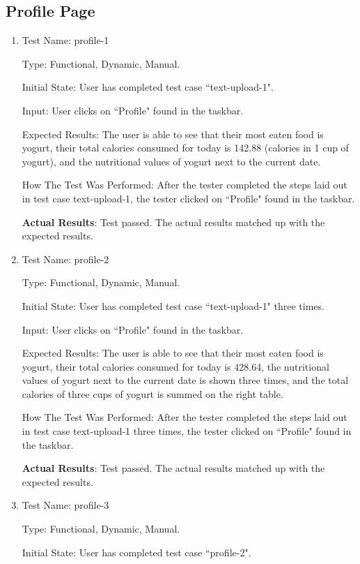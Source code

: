 \documentclass[12pt, titlepage]{article}
\begin{document}
	\subsection{Profile Page}
	\begin{enumerate}
		\item{Test Name: profile-1}
		
		Type: Functional, Dynamic, Manual.
		
		Initial State: User has completed test case ``text-upload-1".
		
		Input: User clicks on ``Profile" found in the taskbar.
		
		Expected Results: The user is able to see that their most eaten food is yogurt, their total calories consumed for today is 142.88 (calories in 1 cup of yogurt), and the nutritional values of yogurt next to the current date.
		
		How The Test Was Performed: After the tester completed the steps laid out in test case text-upload-1, the tester clicked on ``Profile" found in the taskbar.
		
		\textbf{Actual Results}: Test passed. The actual results matched up with the expected results.
		
		\item{Test Name: profile-2}
		
		Type: Functional, Dynamic, Manual.
		
		Initial State: User has completed test case ``text-upload-1" three times.
		
		Input: User clicks on ``Profile" found in the taskbar.
		
		Expected Results: The user is able to see that their most eaten food is yogurt, their total calories consumed for today is 428.64, the nutritional values of yogurt next to the current date is shown three times, and the total calories of three cups of yogurt is summed on the right table.
		
		How The Test Was Performed: After the tester completed the steps laid out in test case text-upload-1 three times, the tester clicked on ``Profile" found in the taskbar.
		
		\textbf{Actual Results}: Test passed. The actual results matched up with the expected results.
		
		\item{Test Name: profile-3}
		
		Type: Functional, Dynamic, Manual.
		
		Initial State: User has completed test case ``profile-2".
		

\end{enumerate}
\end{document}
